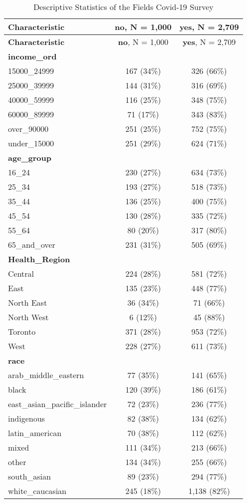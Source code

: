 \documentclass[
  letterpaper,
  DIV=11,
  numbers=noendperiod]{scrartcl}
\begin{document}
\hypertarget{tbl-descriptive-stats}{}
\begin{longtable}[]{@{}lcc@{}}
\caption{\label{tbl-descriptive-stats}Descriptive Statistics of the
Fields Covid-19 Survey}\tabularnewline
\toprule()
\textbf{Characteristic} & \textbf{no}, N = 1,000 & \textbf{yes}, N =
2,709 \\
\midrule()
\endfirsthead
\toprule()
\textbf{Characteristic} & \textbf{no}, N = 1,000 & \textbf{yes}, N =
2,709 \\
\midrule()
\endhead
\textbf{income\_ord} & & \\
15000\_24999 & 167 (34\%) & 326 (66\%) \\
25000\_39999 & 144 (31\%) & 316 (69\%) \\
40000\_59999 & 116 (25\%) & 348 (75\%) \\
60000\_89999 & 71 (17\%) & 343 (83\%) \\
over\_90000 & 251 (25\%) & 752 (75\%) \\
under\_15000 & 251 (29\%) & 624 (71\%) \\
\textbf{age\_group} & & \\
16\_24 & 230 (27\%) & 634 (73\%) \\
25\_34 & 193 (27\%) & 518 (73\%) \\
35\_44 & 136 (25\%) & 400 (75\%) \\
45\_54 & 130 (28\%) & 335 (72\%) \\
55\_64 & 80 (20\%) & 317 (80\%) \\
65\_and\_over & 231 (31\%) & 505 (69\%) \\
\textbf{Health\_Region} & & \\
Central & 224 (28\%) & 581 (72\%) \\
East & 135 (23\%) & 448 (77\%) \\
North East & 36 (34\%) & 71 (66\%) \\
North West & 6 (12\%) & 45 (88\%) \\
Toronto & 371 (28\%) & 953 (72\%) \\
West & 228 (27\%) & 611 (73\%) \\
\textbf{race} & & \\
arab\_middle\_eastern & 77 (35\%) & 141 (65\%) \\
black & 120 (39\%) & 186 (61\%) \\
east\_asian\_pacific\_islander & 72 (23\%) & 236 (77\%) \\
indigenous & 82 (38\%) & 134 (62\%) \\
latin\_american & 70 (38\%) & 112 (62\%) \\
mixed & 111 (34\%) & 213 (66\%) \\
other & 134 (34\%) & 255 (66\%) \\
south\_asian & 89 (23\%) & 294 (77\%) \\
white\_caucasian & 245 (18\%) & 1,138 (82\%) \\
\bottomrule()
\end{longtable}
\end{document}
